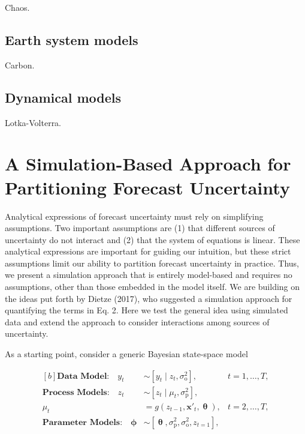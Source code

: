 \documentclass[12pt,]{article}
\begin{document}
Chaos.

\subsection{Earth system models}\label{earth-system-models}

Carbon.

\subsection{Dynamical models}\label{dynamical-models}

Lotka-Volterra.

\section{A Simulation-Based Approach for Partitioning Forecast
Uncertainty}\label{a-simulation-based-approach-for-partitioning-forecast-uncertainty}

Analytical expressions of forecast uncertainty must rely on simplifying
assumptions. Two important assumptions are (1) that different sources of
uncertainty do not interact and (2) that the system of equations is
linear. These analytical expressions are important for guiding our
intuition, but these strict assumptions limit our ability to partition
forecast uncertainty in practice. Thus, we present a simulation approach
that is entirely model-based and requires no assumptions, other than
those embedded in the model itself. We are building on the ideas put
forth by Dietze (2017), who suggested a simulation approach for
quantifying the terms in Eq. 2. Here we test the general idea using
simulated data and extend the approach to consider interactions among
sources of uncertainty.

As a starting point, consider a generic Bayesian state-space model

\begin{equation}
\begin{aligned}[b]
\textbf{Data Model:} \quad y_t &\sim \left[y_t \;|\; z_t, \sigma^2_{\text{o}}\right], &t = 1,\dots,T, \\ 
\textbf{Process Models:} \quad z_t &\sim \left[z_t \;|\; \mu_t, \sigma^2_{\text{p}}\right],  \\ 
\mu_t &= g \left(z_{t-1},\textbf{x}'_t, \bm{\uptheta} \right), &t = 2,\dots,T, \\ 
\textbf{Parameter Models:} \quad \bm{\upphi} &\sim \left[\bm{\uptheta},\sigma^2_{\text{p}},\sigma^2_{\text{o}},z_{t=1} \right],
\end{aligned}
\end{equation}
\end{document}
